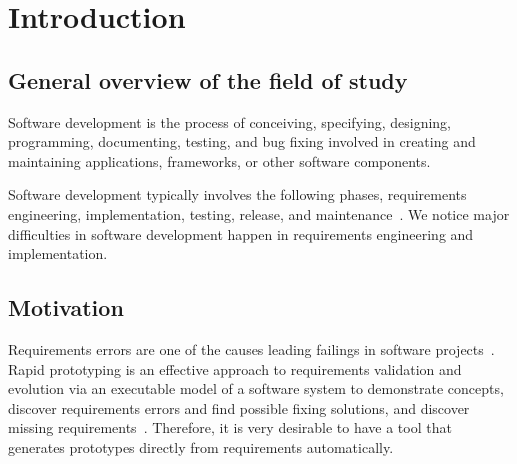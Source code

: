 \chapter{Introduction}



\section{General overview of the field of study}
Software development is the process of conceiving, specifying, designing, programming, documenting, testing, and bug fixing involved in creating and maintaining applications, frameworks, or other software components.

Software development typically involves the following phases, requirements engineering, implementation, testing, release, and maintenance~\cite{petersen2009waterfall}. We notice major difficulties in software development happen in requirements engineering and implementation.


\section{Motivation}

Requirements errors are one of the causes leading failings in software projects~\cite{sutcliffe1999tracing}.
Rapid prototyping is an effective approach to requirements validation and evolution via an executable model of a software system to demonstrate concepts, discover requirements errors and find possible fixing solutions, and discover missing requirements~\cite{kordon2002introduction}.
Therefore, it is very desirable to have a tool that generates prototypes directly from requirements automatically.

